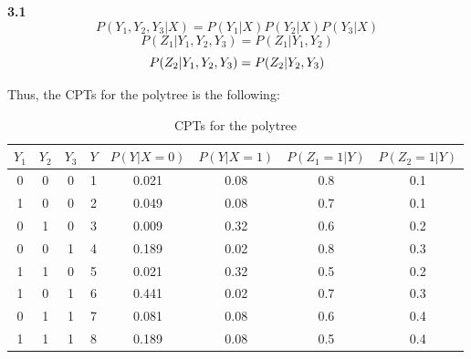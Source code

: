 \documentclass[12pt]{article} %
\title{\textbf{ \begin{LARGE}Artificial Intelligence\end{LARGE}}\\ [0ex]\begin{Large} Homework 3 \end{Large} }
\author{Ning Ma}
\date{} %
\theoremstyle{definition}\newtheorem{law}{Law}
\theoremstyle{plain}\newtheorem{jury}[law]{Jury}
\theoremstyle{remark}\newtheorem{juu}{Juu}
\theoremstyle{definition}\newtheorem{kuu}[law]{Kuu}
\theoremstyle{definition}\newtheorem{muu}{Muu}[section]
\theoremstyle{definition}\newtheorem{honoluu}{Honoluu}[section]
\theoremstyle{definition}\newtheorem{konoluu}[muu]{Konoluu}
\begin{document}
\maketitle
{\bf 3.1}
\begin{equation}
P(Y_1, Y_2, Y_3|X)=P(Y_1|X)P(Y_2|X)P(Y_3|X)
\end{equation}
\begin{equation}
P(Z_1|Y_1, Y_2, Y_3)=P(Z_1|Y_1, Y_2)
\end{equation}
\begin{equation}
P(Z_2|Y_1, Y_2, Y_3)=P(Z_2|Y_2, Y_3)\\
\end{equation}

Thus, the CPTs for the polytree is the following:
\begin{table}[htb]
\caption{CPTs for the polytree}
\centering
\begin{tabular}{|c|c|c|c|c|c|c|c|}
\hline
$Y_1$ & $Y_2$ & $Y_3$ & $Y$ & $P(Y|X=0)$ & $P(Y|X=1)$ & $P(Z_1=1|Y)$ & $P(Z_2=1|Y)$\\
\hline
0 & 0 & 0 & 1 & 0.021 & 0.08 & 0.8 & 0.1\\
\hline
1 & 0 & 0 & 2 & 0.049 & 0.08 & 0.7 & 0.1\\
\hline
0 & 1 & 0 & 3 & 0.009 & 0.32 & 0.6 & 0.2\\
\hline
0 & 0 & 1 & 4 & 0.189 & 0.02 & 0.8 & 0.3\\
\hline
1 & 1 & 0 & 5 & 0.021 & 0.32 & 0.5 & 0.2\\
\hline
1 & 0 & 1 & 6 & 0.441 & 0.02 & 0.7 & 0.3\\
\hline
0 & 1 & 1 & 7 & 0.081 & 0.08 & 0.6 & 0.4\\
\hline
1 & 1 & 1 & 8 & 0.189 & 0.08 & 0.5 & 0.4\\
\hline
\end{tabular}
\label{table:CPTsPolytree}
\end{table}\\
\end{document}
